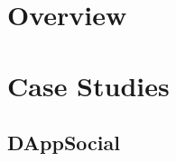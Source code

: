




\coverpage{\TITLE}{\SUBTITLE}{\AUTHOR}{\DATE}{\SUBJECT}
\newpage
\backgroundbarvisiblefalse
\pagestyle{plain}



\newpage
\tableofcontents

\part{Overview} \label{sec:overview}


% 


\part{Case Studies}
\chapter{DAppSocial} \label{ch:case-study-dapp-social}

